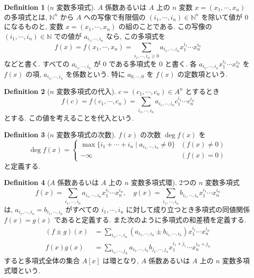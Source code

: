 \documentclass[a4paper,dvipdfmx]{jsarticle}
\theoremstyle{plain}
\theoremstyle{definition}
\theoremstyle{plain}
\numberwithin{equation}{section}
\numberwithin{theorem}{section}
\numberwithin{definition}{section}
\numberwithin{note}{section}
\theoremstyle{definition}
\newtheorem{dfn}{Definition}[section]
\begin{document}
\begin{dfn}[$n$ 変数多項式]
  $A$ 係数あるいは $A$ 上の $n$ 変数 $x = (x_1,\cdots,x_n)$ の多項式とは, $\mathbb{N}^n$ から $A$ への写像で有限個の $(i_1,\cdots,i_n)\in\mathbb{N}^n$ を除いて値が $0$ になるものと, 変数 $x = (x_1,\cdots,x_n)$ の組のことである. この写像の $(i_1,\cdots,i_n)\in\mathbb{N}$ での値が $a_{i_1,\cdots,i_n}$ なら, この多項式を
  $$
    f(x) = f(x_1,\cdots,x_n) = \sum_{i_1,\cdots,i_n\geq 0}a_{i_1,\cdots,i_n}x_1^{i_1}\cdots x_n^{i_n}
  $$
  などと書く. すべての $a_{i_1,\cdots,i_n}$ が $0$ である多項式を $0$ と書く. 各 $a_{i_1,\cdots,i_n}x_1^{i_1}\cdots x_n^{i_n}$ を $f(x)$ の項, $a_{i_1,\cdots,i_n}$ を係数という. 特に $a_{0,\cdots,0}$ を $f(x)$ の定数項という.
\end{dfn}
\begin{dfn}[$n$ 変数多項式の代入]
  $c = (c_1,\cdots,c_n) \in A^n$ とするとき
  $$
    f(c) = f(c_1,\cdots,c_n) = \sum_{i_1,\cdots,i_n}a_{i_1,\cdots,i_n}c_1^{i_1}\cdots c_n^{i_n}
  $$
  とする. この値を考えることを代入という.
\end{dfn}
\begin{dfn}[$n$ 変数多項式の次数]
  $f(x)$ の次数 $\deg f(x)$ を
  $$
    \deg f(x) = \begin{cases}
      \max\lbrace i_1 + \cdots + i_n \mid a_{i_1,\cdots,i_n} \neq 0 \rbrace & (f(x) \neq 0) \\
      -\infty                                                               & (f(x) = 0)
    \end{cases}
  $$
  と定義する.
\end{dfn}
\begin{dfn}[$A$ 係数あるいは $A$ 上の $n$ 変数多項式環]
  2つの $n$ 変数多項式
  $$
    f(x) = \sum_{i_1,\cdots,i_n}a_{i_1,\cdots,i_n}x_1^{i_1}\cdots x_n^{i_n}, \quad g(x) = \sum_{i_1,\cdots,i_n}b_{i_1,\cdots,i_n}x_1^{i_1}\cdots x_n^{i_n}
  $$
  は, $a_{i_1,\cdots,i_n} = b_{i_1,\cdots,i_n}$ がすべての $i_1,\cdots,i_n$ に対して成り立つとき多項式の同値関係 $f(x) = g(x)$ であると定義する. また次のように多項式の和差積を定義する.
  \begin{align}
    (f\pm g)(x) & = \sum_{i_1,\cdots,i_n}(a_{i_1,\cdots,i_n}\pm b_{i_1,\cdots,i_n})x_1^{i_1}\cdots x_n^{i_n}   \\
    f(x)g(x)    & = \sum_{i_1,\cdots,j_n}a_{i_1,\cdots,i_n}b_{j_1,\cdots,j_n}x_1^{i_1+j_1}\cdots x_n^{i_n+j_n}
  \end{align}
  すると多項式全体の集合 $A[x]$ は環となり, $A$ 係数あるいは $A$ 上の $n$ 変数多項式環という.
\end{dfn}
\end{document}

